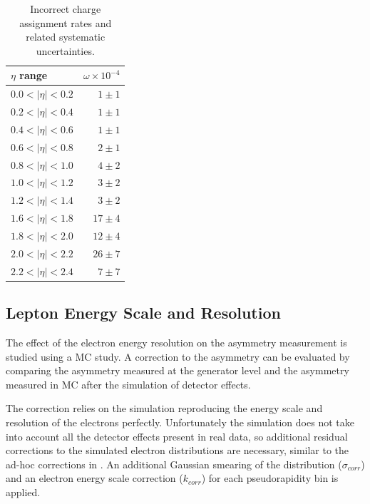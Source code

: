 \begin{table}[htbp]
  \begin{center}
\begin{tabular}{lr}
\toprule
$\eta$ range        & $\omega \times 10^{-4}$    \\
\midrule
$0.0<| \eta |<0.2$  & $ 1 \pm 1 $    \\ 
$0.2<| \eta |<0.4$  & $ 1 \pm 1 $    \\
$0.4<| \eta |<0.6$  & $ 1 \pm 1 $    \\
$0.6<| \eta |<0.8$  & $ 2 \pm 1 $    \\
$0.8<| \eta |<1.0$  & $ 4 \pm 2 $    \\ 
$1.0<| \eta |<1.2$  & $ 3 \pm 2 $    \\
$1.2<| \eta |<1.4$  & $ 3 \pm 2 $    \\
$1.6<| \eta |<1.8$  & $17 \pm 4 $    \\
$1.8<| \eta |<2.0$  & $12 \pm 4 $    \\
$2.0<| \eta |<2.2$  & $26 \pm 7 $    \\
$2.2<| \eta |<2.4$  & $ 7 \pm 7 $    \\
\bottomrule
\end{tabular}
\caption[Incorrect charge assignment rates and related systematic
uncertainties.]{\label{tab:mischarge}Incorrect charge assignment rates and
related systematic uncertainties\cite{bendavid2011electron}.}
\end{center}
\end{table}

\subsection{Lepton Energy Scale and Resolution}
The effect of the electron energy resolution on the asymmetry measurement is
studied using a {MC} study. A correction to the asymmetry can be evaluated by
comparing the asymmetry measured at the generator level and the asymmetry
measured in {MC} after the simulation of detector effects.

The correction relies on the simulation reproducing the energy scale and
resolution of the electrons perfectly. Unfortunately the simulation does not
take into account all the detector effects present in real data, so additional
residual corrections to the simulated electron \pT distributions are necessary,
similar to the ad-hoc corrections in . 
An additional Gaussian smearing of the \pT distribution ($\sigma_{corr}$) and an
electron energy scale correction ($k_{corr}$) for each pseudorapidity bin is
applied\cite{bauer2011higgs}.

